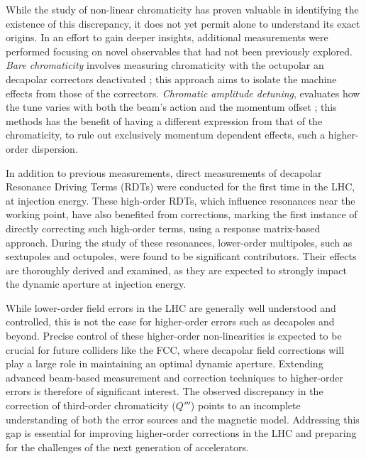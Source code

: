 While the study of non-linear chromaticity has proven valuable in identifying the existence of this
discrepancy, it does not yet permit alone to understand its exact origins. In an effort to gain
deeper insights, additional measurements were performed focusing on novel observables that had not
been previously explored.
\textit{Bare chromaticity} involves measuring chromaticity with
the octupolar an decapolar correctors deactivated ; this approach aims to isolate the machine
effects from those of the correctors.
\textit{Chromatic amplitude detuning}, evaluates how the tune varies with both the beam's action and
the momentum offset ; this methods has the benefit of having a different expression from that of the
chromaticity, to rule out exclusively momentum dependent effects, such a higher-order dispersion.

In addition to previous measurements, direct measurements of decapolar Resonance Driving Terms
(RDTs) were conducted for the first time in the LHC, at injection energy. These high-order RDTs,
which influence resonances near the working point, have also benefited from corrections, marking the
first instance of directly correcting such high-order terms, using a response matrix-based approach.
During the study of these resonances, lower-order multipoles, such as sextupoles and octupoles, were
found to be significant contributors. Their effects are thoroughly derived and examined, as they are
expected to strongly impact the dynamic aperture at injection energy.

While lower-order field errors in the LHC are generally well understood and controlled, this is not
the case for higher-order errors such as decapoles and beyond. Precise control of these higher-order
non-linearities is expected to be crucial for future colliders like the FCC, where decapolar field
corrections will play a large role in maintaining an optimal dynamic aperture. Extending advanced
beam-based measurement and correction techniques to higher-order errors is therefore of significant
interest.
The observed discrepancy in the correction of third-order chromaticity ($Q'''$) points to an
incomplete understanding of both the error sources and the magnetic model. Addressing this gap is
essential for improving higher-order corrections in the LHC and preparing for the challenges of the
next generation of accelerators.


\subsection{}

